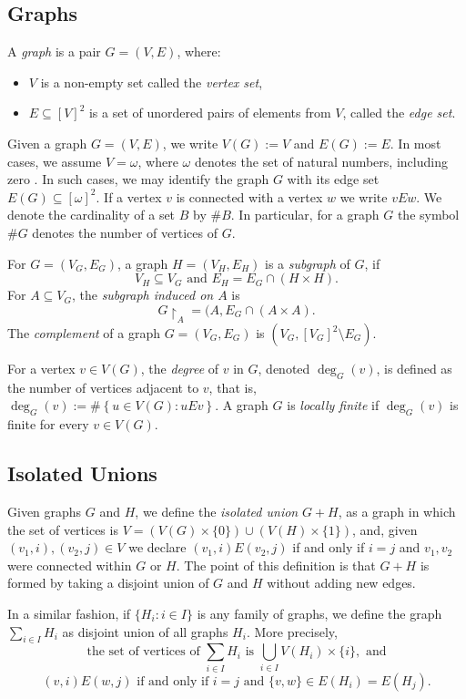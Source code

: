 \documentclass{amsart}
\theoremstyle{plain}
\theoremstyle{definition}
\theoremstyle{remark}
\numberwithin{equation}{section}
\newcommand{\s}{\subseteq}
\begin{document}
\subsection{Graphs}
A \emph{graph} is a pair \( G = (V, E) \), where:
\begin{itemize}
  \item \( V \) is a non-empty set called the \emph{vertex set},
  \item \( E \subseteq [V]^2 \) is a set of unordered pairs of elements from \( V \), called the \emph{edge set}.
\end{itemize}
Given a graph \( G = (V, E) \), we write \( V(G) := V \) and \( E(G) := E \). In most cases, we assume \( V = \omega \), where \( \omega \) denotes the set of natural numbers, including zero .  In such cases, we may identify the graph \( G \) with its edge set \( E(G) \subseteq [\omega]^2 \). If a vertex $v$ is connected with a vertex $w$ we write $v E w$. We denote the cardinality of a set \(B\) by \(\#B\).  In particular, for a graph \(G\) the symbol \(\#G\) denotes the number of vertices of \(G\).

For \( G = (V_G, E_G) \), a graph \( H = (V_H, E_H) \) is a \emph{subgraph} of $G$, if 
$$V_H \s V_G \text{ and }E_H=E_G\cap (H\times H).$$ For $A\s V_G$, the \emph{subgraph induced on $A$} is 
$$G\restriction_A=(A, E_G\cap (A\times A).$$
The \emph{complement} of a graph \( G = (V_G, E_G) \) is \((V_G, [V_G]^2\setminus E_G) \).


For a vertex \( v \in V(G) \), the \emph{degree} of \( v \) in \( G \), denoted \( \operatorname{deg}_G(v) \), is defined as the number of vertices adjacent to \( v \), that is,
\(\operatorname{deg}_G(v) := \# \left\{ u \in V(G) :u E v  \right\}\). A graph $G$ is \emph{locally finite} if $\operatorname{deg}_G(v)$ is finite for every $v \in V(G)$.


\subsection{Isolated Unions}

Given graphs $G$ and $H$, we define the \emph{isolated union} $G+H$, as a graph in which the set of vertices is $V=(V(G)\times \{0\}) \cup (V(H)\times \{1\})$, and, given $(v_1,i),(v_2,j)\in V$ we declare $(v_1,i)E(v_2,j)$ if and only if $i=j$ and $v_1,v_2$ were connected within $G$ or $H$. The point of this definition is that $G+H$ is formed by taking a disjoint union of $G$ and $H$ without adding new edges.

In a similar fashion, if $\{H_i : i\in I\}$ is any family of graphs, we define the graph $\sum\limits_{i\in I}H_i$ as disjoint union of all graphs $H_i$. More precisely,\[ \text{ the set of vertices of } \sum\limits_{i\in I}H_i \text{ is } \bigcup\limits_{i\in I}V(H_i)\times \{i\}, \text{ and }\]
$$(v,i)E(w,j) \text{ if and only if }i=j \text{ and } \{v,w\} \in E(H_i)=E(H_j).$$
\end{document}
